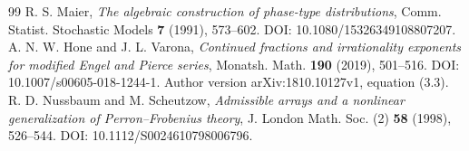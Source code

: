\begin{thebibliography}{99}
 R. S. Maier, \emph{The algebraic construction of phase-type distributions}, Comm. Statist. Stochastic Models \textbf{7} (1991), 573--602. DOI: 10.1080/15326349108807207.
 A. N. W. Hone and J. L. Varona, \emph{Continued fractions and irrationality exponents for modified Engel and Pierce series}, Monatsh. Math. \textbf{190} (2019), 501--516. DOI: 10.1007/s00605-018-1244-1. Author version arXiv:1810.10127v1, equation (3.3).
 R. D. Nussbaum and M. Scheutzow, \emph{Admissible arrays and a nonlinear generalization of Perron--Frobenius theory}, J. London Math. Soc. (2) \textbf{58} (1998), 526--544. DOI: 10.1112/S0024610798006796.
\end{thebibliography}
